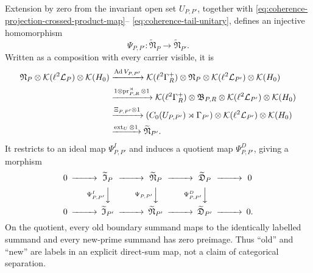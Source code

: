 Extension by zero from the invariant open set $U_{P,P'}$, together with
\eqref{eq:coherence-projection-crossed-product-map}--
\eqref{eq:coherence-tail-unitary}, defines an injective homomorphism
\begin{equation}
 \Psi_{P,P'}:\widetilde{\mathfrak N}_P
 \longrightarrow\widetilde{\mathfrak N}_{P'}.
 \label{eq:coherence-natural-middle-transition}
\end{equation}
Written as a composition with every carrier visible, it is
\begin{align}
 \mathfrak N_P\otimes\mathcal K(\ell^2\mathcal L_P)\otimes\mathcal K(H_0)
 &\xrightarrow{\operatorname{Ad}V_{P,P'}}
 \mathcal K(\ell^2\Gamma_R^+)\otimes\mathfrak N_P
 \otimes\mathcal K(\ell^2\mathcal L_{P'})\otimes\mathcal K(H_0)
 \notag\\
 &\xrightarrow{1\otimes\operatorname{pr}_{P,R}^{\rtimes}\otimes1}
 \mathcal K(\ell^2\Gamma_R^+)\otimes\mathfrak B_{P,R}
 \otimes\mathcal K(\ell^2\mathcal L_{P'})\otimes\mathcal K(H_0)
 \notag\\
 &\xrightarrow{\Xi_{P,P'}\otimes1}
 (C_0(U_{P,P'})\rtimes\Gamma_{P'})
 \otimes\mathcal K(\ell^2\mathcal L_{P'})\otimes\mathcal K(H_0)
 \notag\\
 &\xrightarrow{\operatorname{ext}_{U}\otimes1}
 \widetilde{\mathfrak N}_{P'}.
 \label{eq:coherence-natural-middle-transition-expanded}
\end{align}
It restricts to an ideal map $\Psi^I_{P,P'}$ and induces a quotient map
$\Psi^D_{P,P'}$, giving a morphism
\begin{equation}
\begin{CD}
0@>>>\widetilde{\mathfrak I}_P@>>>\widetilde{\mathfrak N}_P
 @>>>\widetilde{\mathfrak D}_P@>>>0\\
@.@V{\Psi^I_{P,P'}}VV@V{\Psi_{P,P'}}VV@V{\Psi^D_{P,P'}}VV@.\\
0@>>>\widetilde{\mathfrak I}_{P'}@>>>\widetilde{\mathfrak N}_{P'}
 @>>>\widetilde{\mathfrak D}_{P'}@>>>0.
\end{CD}
\label{eq:coherence-natural-extension-transition}
\end{equation}
On the quotient, every old boundary summand maps to the identically labelled
summand and every new-prime summand has zero preimage.  Thus ``old'' and
``new'' are labels in an explicit direct-sum map, not a claim of categorical
separation.

